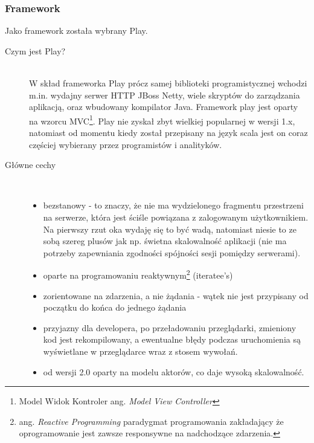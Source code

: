 \subsubsection{Framework}

Jako framework została wybrany Play.

\begin{description}
	\item[Czym jest Play?]\hfill \\
		W skład frameworka Play prócz samej biblioteki programistycznej wchodzi m.in. wydajny serwer HTTP JBoss Netty, wiele skryptów do zarządzania aplikacją, oraz wbudowany kompilator Java. Framework play jest oparty na wzorcu MVC\footnote{Model Widok Kontroler ang. \emph{Model View Controller}}. Play nie zyskał zbyt wielkiej popularnej w wersji 1.x, natomiast od momentu kiedy został przepisany na język scala jest on coraz częściej wybierany przez programistów i analityków. 
	\item[Główne cechy]\hfill \\
		\begin{itemize}
		\item bezstanowy - to znaczy, że nie ma wydzielonego fragmentu przestrzeni na serwerze, która jest ściśle powiązana z zalogowanym użytkownikiem. Na pierwszy rzut oka wydaję się to być wadą, natomiast niesie to ze sobą szereg plusów jak np. świetna skalowalność aplikacji (nie ma potrzeby zapewniania zgodności spójności sesji pomiędzy serwerami).
		\item oparte na programowaniu reaktywnym\footnote{ang. \emph{Reactive Programming} paradygmat programowania zakładający że oprogramowanie jest zawsze responsywne na nadchodzące zdarzenia.}
 (iteratee's) 		
		\item zorientowane na zdarzenia, a nie żądania - wątek nie jest przypisany od początku do końca do jednego żądania
		\item przyjazny dla developera, po przeładowaniu przeglądarki, zmieniony kod jest rekompilowany, a ewentualne błędy podczas uruchomienia są wyświetlane w przeglądarce wraz z stosem wywołań.
		\item od wersji 2.0 oparty na modelu aktorów, co daje wysoką skalowalność. 
		\end{itemize}
\end{description}




